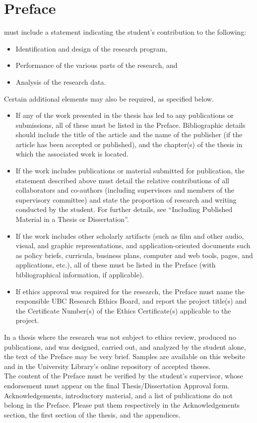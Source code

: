 \chapter*{Preface}
   must include a statement indicating the student's contribution to the 
    following:
  \begin{itemize}
    \item Identification and design of the research program,
    \item Performance of the various parts of the research, and
    \item Analysis of the research data.
  \end{itemize}
  Certain additional elements may also be required, as specified below.
  \begin{itemize}
    \item If any of the work presented in the thesis has led to any publications or submissions, all 
      of these must be listed in the Preface. Bibliographic details should include the title of the 
      article and the name of the publisher (if the article has been accepted or published), and the 
      chapter(s) of the thesis in which the associated work is located.
    \item If the work includes publications or material submitted for publication, the statement 
      described above must detail the relative contributions of all collaborators and co-authors 
      (including supervisors and members of the supervisory committee) and state the proportion of 
      research and writing conducted by the student. For further details, see “Including Published 
      Material in a Thesis or Dissertation”.
    \item If the work includes other scholarly artifacts (such as film and other audio, visual, and 
      graphic representations, and application-oriented documents such as policy briefs, curricula, 
      business plans, computer and web tools, pages, and applications, etc.), all of these must be 
      listed in the Preface (with bibliographical information, if applicable).
    \item If ethics approval was required for the research, the Preface must name the responsible 
      UBC Research Ethics Board, and report the project title(s) and the Certificate Number(s) of 
      the Ethics Certificate(s) applicable to the project.
  \end{itemize}
  In a thesis where the research was not subject to ethics review, produced no publications, and was 
    designed, carried out, and analyzed by the student alone, the text of the Preface may be very 
    brief. Samples are available on this website and in the University Library's online repository 
    of accepted theses. \\
  The content of the Preface must be verified by the student's supervisor, whose endorsement must 
    appear on the final Thesis/Dissertation Approval form. \\
  Acknowledgements, introductory material, and a list of publications do not belong in the Preface. 
    Please put them respectively in the Acknowledgements section, the first section of the thesis, 
    and the appendices. \\

